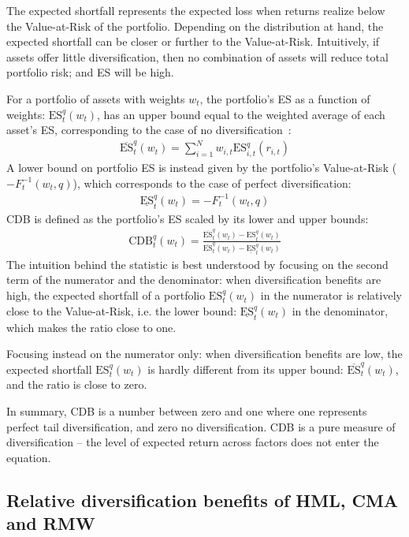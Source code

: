 The expected shortfall represents the expected loss when returns realize below the Value-at-Risk of the portfolio. Depending on the distribution at hand, the expected shortfall can be closer or further to the Value-at-Risk. Intuitively, if assets offer little diversification, then no combination of assets will reduce total portfolio risk; and ES will be high. 

For a portfolio of assets with weights $w_t$, the portfolio's ES as a function of weights: $\text{ES}_t^q(w_t)$, has an upper bound equal to the weighted average of each asset's ES, corresponding to the case of no diversification~\autocite{Artzner1999}:
\begin{align}
  \overline{\text{ES}}_t^q(w_t) = \sum_{i=1}^N w_{i,t} \text{ES}_{i,t}^q(r_{i,t})
\end{align}
A lower bound on portfolio ES is instead given by the portfolio's Value-at-Risk ($-F_{t}^{-1}(w_t, q)$), which corresponds to the case of perfect diversification:
\begin{align}
  \underline{\text{ES}}_t^q(w_t) = -F_{t}^{-1}(w_t, q)
\end{align}
CDB is defined as the portfolio's ES scaled by its lower and upper bounds:
\begin{align}
  \text{CDB}_t^q(w_t) = \frac{\overline{\text{ES}}_t^q(w_t) - \text{ES}_t^q(w_t)}{\overline{\text{ES}}_t^q(w_t) - \underline{\text{ES}}_t^q(w_t)}
\end{align}
The intuition behind the statistic is best understood by focusing on the second term of the numerator and the denominator: when diversification benefits are high, the expected shortfall of a portfolio $\text{ES}_t^q(w_t)$ in the numerator is relatively close to the Value-at-Risk, i.e. the lower bound: $\underline{\text{ES}}_t^q(w_t)$ in the denominator, which makes the ratio close to one. 

Focusing instead on the numerator only: when diversification benefits are low, the expected shortfall $\text{ES}_t^q(w_t)$ is hardly different from its upper bound: $\overline{\text{ES}}_t^q(w_t)$, and the ratio is close to zero.

In summary, CDB is a number between zero and one where one represents perfect tail diversification, and zero no diversification. CDB is a pure measure of diversification -- the level of expected return across factors does not enter the equation.

\subsection{Relative diversification benefits of HML, CMA and RMW}

